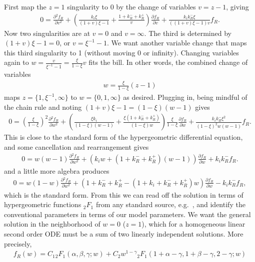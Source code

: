 \documentclass[12pt]{article}%
\newcommand{\pderiv}[2][{}]{\frac{\partial #1}{\partial #2}}
\newcommand{\psecderiv}[2][{}]{\frac{\partial{^2} #1}{\partial #2{^2}}}
\begin{document}
First map the $z=1$ singularity to 0 by the change of variables $v=z-1$, giving
\begin{align}
0 = \psecderiv[f_R]{v}
        + \left(\frac{k_i\xi}{(1+v)\xi - 1}
                + \frac{1 + k_R^- + k_R^+}{v}
        \right)\pderiv[f_R]{v}
        + \frac{k_i k_R^- \xi}{((1+v)\xi - 1)v}f_R.
\end{align}
Now two singularities are at $v=0$ and $v=\infty$.
The third is determined by $(1+v)\xi -1 = 0$, or $v=\xi^{-1} - 1$.
We want another variable change that maps this third singularity to 1
(without moving 0 or infinity). Changing variables again to
$w=\frac{v}{\xi^{-1} - 1} = \frac{\xi}{1-\xi} v$ fits the bill.
In other words, the combined change of variables
\begin{align}
w = \frac{\xi}{1-\xi} (z-1)
\end{align}
maps $z = \{1, \xi^{-1}, \infty\}$ to $w =\{0, 1, \infty\}$ as desired.
Plugging in, being mindful of the chain rule and noting
$(1 + v)\xi - 1 = (1 - \xi)(w - 1)$ gives
\begin{align}
0 = \left(\frac{\xi}{1-\xi}\right)^2 \psecderiv[f_R]{w}
+ \left(
        \frac{\xi k_i}{(1-\xi)(w-1)} + \frac{\xi(1 + k_R^- + k_R^+)}{(1-\xi)w}
\right) \frac{\xi}{1-\xi} \pderiv[f_R]{w}
+ \frac{k_i k_R^- \xi^2}{(1-\xi)^2 w(w-1)}f_R.
\end{align}
This is close to the standard form of the hypergeometric differential
equation, and some cancellation and rearrangement gives
\begin{align}
0 = w(w-1)\psecderiv[f_R]{w}
+ \left(k_i w + (1 + k_R^- + k_R^+)(w-1)\right) \pderiv[f_R]{w}
+ k_i k_R^- f_R.
\end{align}
and a little more algebra produces
\begin{align}
0 = w(1-w)\psecderiv[f_R]{w}
+ \left(1 + k_R^- + k_R^+
        - (1 + k_i + k_R^- + k_R^+)w
\right) \pderiv[f_R]{w}
- k_i k_R^- f_R,
\end{align}
which is the standard form. From this we can read off the solution
in terms of hypergeometric functions ${_2F_1}$ from
any standard source, e.g.~\cite{Abramowitz1964}, and identify the
conventional parameters in terms of our model parameters.
We want the general solution in the neighborhood of $w=0$ ($z=1$),
which for a homogeneous linear second order ODE must be a sum of two
linearly independent solutions.
More precisely,
\begin{align}
f_R(w) = C_1 {_2F_1}(\alpha, \beta, \gamma; w)
+ C_2 w^{1-\gamma}{_2F_1}(1+\alpha-\gamma, 1+\beta-\gamma, 2-\gamma; w)
\end{align}
\end{document}
